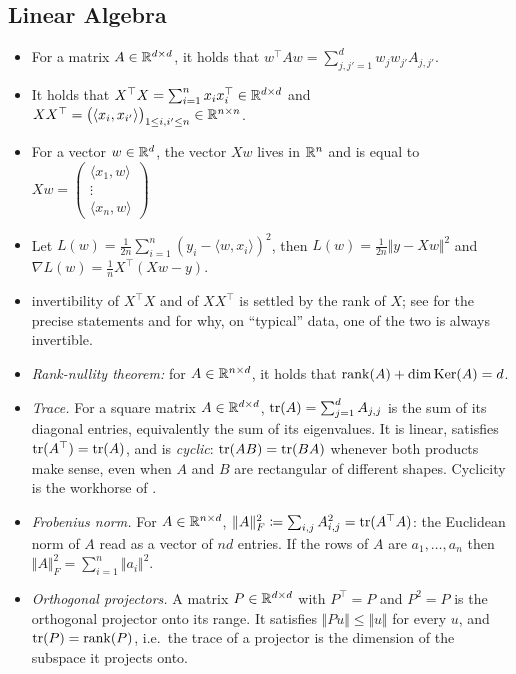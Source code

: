 \subsection{Linear Algebra}
\label{sec:cheat-linalg}

\begin{itemize}
    \item For a matrix $A \in \mathbb{R}^{d \times d}$, it holds that $w^\top A w = \sum_{j, j' = 1}^d w_j w_{j'} A_{j, j'}$.
    \item It holds that $X^\top X = \sum_{i=1}^n x_i x_i^\top \in \mathbb{R}^{d \times d}$ and $X X^\top = \big (\langle x_i, x_{i'} \rangle \big )_{1 \leq i, i' \leq n} \in \mathbb{R}^{n \times n}$.
    \item For a vector $w \in \mathbb{R}^d$, the vector $X w$ lives in $\mathbb{R}^n$ and is equal to $Xw = \begin{pmatrix}
\langle x_1, w \rangle  \\
\vdots  \\
\langle x_n, w \rangle 
\end{pmatrix}
$
    \item Let $L(w) = \frac{1}{2n} \sum_{i = 1}^n (y_i - \langle w, x_i \rangle)^2$, then $L(w) = \frac{1}{2n} \Vert y - X w \Vert^2$ and $\nabla L(w) = \frac{1}{n} X^\top (X w - y)$.
    \item invertibility of $X^\top X$ and of $X X^\top$ is settled by the rank of $X$; see  for the precise statements and for why, on ``typical'' data, one of the two is always invertible.
    \item \textit{Rank-nullity theorem:} for $A \in \mathbb{R}^{n \times d}$, it holds that $\operatorname{rank}(A) + \dim \mathrm{Ker}(A) = d$.
    \item \textit{Trace.} For a square matrix $A \in \mathbb{R}^{d \times d}$, $\operatorname{tr}(A) = \sum_{j=1}^d A_{j,j}$ is the sum of its diagonal entries, equivalently the sum of its eigenvalues. It is linear, satisfies $\operatorname{tr}(A^\top) = \operatorname{tr}(A)$, and is \emph{cyclic}: $\operatorname{tr}(AB) = \operatorname{tr}(BA)$ whenever both products make sense, even when $A$ and $B$ are rectangular of different shapes. Cyclicity is the workhorse of .
    \item \textit{Frobenius norm.} For $A \in \mathbb{R}^{n \times d}$, $\Vert A \Vert_F^2 \coloneqq \sum_{i,j} A_{i,j}^2 = \operatorname{tr}(A^\top A)$: the Euclidean norm of $A$ read as a vector of $nd$ entries. If the rows of $A$ are $a_1, \dots, a_n$ then $\Vert A \Vert_F^2 = \sum_{i=1}^n \Vert a_i \Vert^2$.
    \item \textit{Orthogonal projectors.} A matrix $P \in \mathbb{R}^{d \times d}$ with $P^\top = P$ and $P^2 = P$ is the orthogonal projector onto its range. It satisfies $\Vert P u \Vert \leq \Vert u \Vert$ for every $u$, and $\operatorname{tr}(P) = \operatorname{rank}(P)$, i.e.\ the trace of a projector is the dimension of the subspace it projects onto.
\end{itemize}


